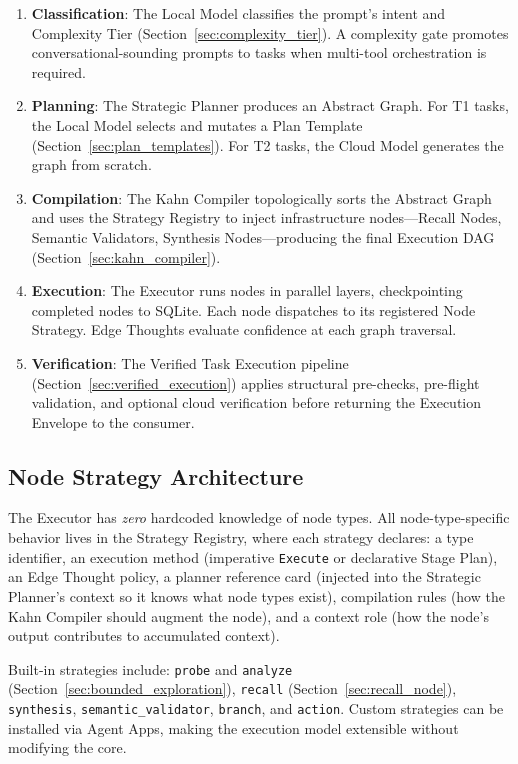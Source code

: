 \documentclass{article}
\begin{document}
\begin{enumerate}[leftmargin=*]
\item \textbf{Classification}: The Local Model classifies the prompt's intent and Complexity Tier (Section~\ref{sec:complexity_tier}). A complexity gate promotes conversational-sounding prompts to tasks when multi-tool orchestration is required.
\item \textbf{Planning}: The Strategic Planner produces an Abstract Graph. For T1 tasks, the Local Model selects and mutates a Plan Template (Section~\ref{sec:plan_templates}). For T2 tasks, the Cloud Model generates the graph from scratch.
\item \textbf{Compilation}: The Kahn Compiler topologically sorts the Abstract Graph and uses the Strategy Registry to inject infrastructure nodes---Recall Nodes, Semantic Validators, Synthesis Nodes---producing the final Execution DAG (Section~\ref{sec:kahn_compiler}).
\item \textbf{Execution}: The Executor runs nodes in parallel layers, checkpointing completed nodes to SQLite. Each node dispatches to its registered Node Strategy. Edge Thoughts evaluate confidence at each graph traversal.
\item \textbf{Verification}: The Verified Task Execution pipeline (Section~\ref{sec:verified_execution}) applies structural pre-checks, pre-flight validation, and optional cloud verification before returning the Execution Envelope to the consumer.
\end{enumerate}

\subsection{Node Strategy Architecture}

The Executor has \emph{zero} hardcoded knowledge of node types.
All node-type-specific behavior lives in the Strategy Registry, where each strategy declares:
a type identifier,
an execution method (imperative \texttt{Execute} or declarative Stage Plan),
an Edge Thought policy,
a planner reference card (injected into the Strategic Planner's context so it knows what node types exist),
compilation rules (how the Kahn Compiler should augment the node), and
a context role (how the node's output contributes to accumulated context).

Built-in strategies include: \texttt{probe} and \texttt{analyze} (Section~\ref{sec:bounded_exploration}), \texttt{recall} (Section~\ref{sec:recall_node}), \texttt{synthesis}, \texttt{semantic\_validator}, \texttt{branch}, and \texttt{action}.
Custom strategies can be installed via Agent Apps, making the execution model extensible without modifying the core.
\end{document}
